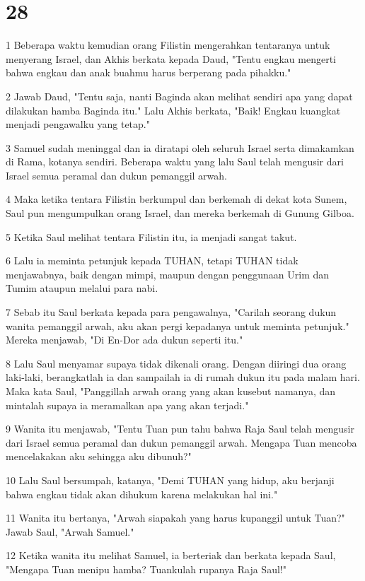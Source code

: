 \chapter{28}

\par 1 Beberapa waktu kemudian orang Filistin mengerahkan tentaranya untuk menyerang Israel, dan Akhis berkata kepada Daud, "Tentu engkau mengerti bahwa engkau dan anak buahmu harus berperang pada pihakku."
\par 2 Jawab Daud, "Tentu saja, nanti Baginda akan melihat sendiri apa yang dapat dilakukan hamba Baginda itu." Lalu Akhis berkata, "Baik! Engkau kuangkat menjadi pengawalku yang tetap."
\par 3 Samuel sudah meninggal dan ia diratapi oleh seluruh Israel serta dimakamkan di Rama, kotanya sendiri. Beberapa waktu yang lalu Saul telah mengusir dari Israel semua peramal dan dukun pemanggil arwah.
\par 4 Maka ketika tentara Filistin berkumpul dan berkemah di dekat kota Sunem, Saul pun mengumpulkan orang Israel, dan mereka berkemah di Gunung Gilboa.
\par 5 Ketika Saul melihat tentara Filistin itu, ia menjadi sangat takut.
\par 6 Lalu ia meminta petunjuk kepada TUHAN, tetapi TUHAN tidak menjawabnya, baik dengan mimpi, maupun dengan penggunaan Urim dan Tumim ataupun melalui para nabi.
\par 7 Sebab itu Saul berkata kepada para pengawalnya, "Carilah seorang dukun wanita pemanggil arwah, aku akan pergi kepadanya untuk meminta petunjuk." Mereka menjawab, "Di En-Dor ada dukun seperti itu."
\par 8 Lalu Saul menyamar supaya tidak dikenali orang. Dengan diiringi dua orang laki-laki, berangkatlah ia dan sampailah ia di rumah dukun itu pada malam hari. Maka kata Saul, "Panggillah arwah orang yang akan kusebut namanya, dan mintalah supaya ia meramalkan apa yang akan terjadi."
\par 9 Wanita itu menjawab, "Tentu Tuan pun tahu bahwa Raja Saul telah mengusir dari Israel semua peramal dan dukun pemanggil arwah. Mengapa Tuan mencoba mencelakakan aku sehingga aku dibunuh?"
\par 10 Lalu Saul bersumpah, katanya, "Demi TUHAN yang hidup, aku berjanji bahwa engkau tidak akan dihukum karena melakukan hal ini."
\par 11 Wanita itu bertanya, "Arwah siapakah yang harus kupanggil untuk Tuan?" Jawab Saul, "Arwah Samuel."
\par 12 Ketika wanita itu melihat Samuel, ia berteriak dan berkata kepada Saul, "Mengapa Tuan menipu hamba? Tuankulah rupanya Raja Saul!"
